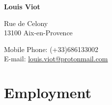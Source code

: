 \documentclass{article}
\begin{document}
{\huge \bf Louis Viot}\\
\bigskip
\begin{minipage}[t]{0.5\textwidth}
    Rue de Celony\\
    13100 Aix-en-Provence
\end{minipage}
\begin{minipage}[t]{0.5\textwidth}
\begin{flushright}
	Mobile Phone: (+33)686133002 \\
	E-mail: \href{mailto:louis.viot@protonmail.com}{louis.viot@protonmail.com} \\
\end{flushright}
\end{minipage}

\section*{Employment}
\end{document}
